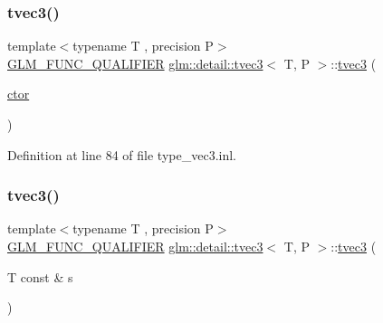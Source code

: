 \mbox{\label{structglm_1_1detail_1_1tvec3_a5c1bc887c279d54e39c038c1f201e60b}} 
\subsubsection{\texorpdfstring{tvec3()}{tvec3()}\hspace{0.1cm}{\footnotesize\ttfamily [4/17]}}
{\footnotesize\ttfamily template$<$typename T , precision P$>$ \\
\hyperlink{setup_8hpp_a33fdea6f91c5f834105f7415e2a64407}{G\+L\+M\+\_\+\+F\+U\+N\+C\+\_\+\+Q\+U\+A\+L\+I\+F\+I\+ER} \hyperlink{structglm_1_1detail_1_1tvec3}{glm\+::detail\+::tvec3}$<$ T, P $>$\+::\hyperlink{structglm_1_1detail_1_1tvec3}{tvec3} (\begin{DoxyParamCaption}\item[{\hyperlink{structglm_1_1detail_1_1tvec3_a370bdb3bb793461504b1387daec78083}{ctor}}]{ }\end{DoxyParamCaption})\hspace{0.3cm}{\ttfamily [explicit]}}



Definition at line 84 of file type\+\_\+vec3.\+inl.

\mbox{\label{structglm_1_1detail_1_1tvec3_a2a9b1dc81918af347e4726ee1666d5de}} 
\subsubsection{\texorpdfstring{tvec3()}{tvec3()}\hspace{0.1cm}{\footnotesize\ttfamily [5/17]}}
{\footnotesize\ttfamily template$<$typename T , precision P$>$ \\
\hyperlink{setup_8hpp_a33fdea6f91c5f834105f7415e2a64407}{G\+L\+M\+\_\+\+F\+U\+N\+C\+\_\+\+Q\+U\+A\+L\+I\+F\+I\+ER} \hyperlink{structglm_1_1detail_1_1tvec3}{glm\+::detail\+::tvec3}$<$ T, P $>$\+::\hyperlink{structglm_1_1detail_1_1tvec3}{tvec3} (\begin{DoxyParamCaption}\item[{T const \&}]{s }\end{DoxyParamCaption})\hspace{0.3cm}{\ttfamily [explicit]}}



